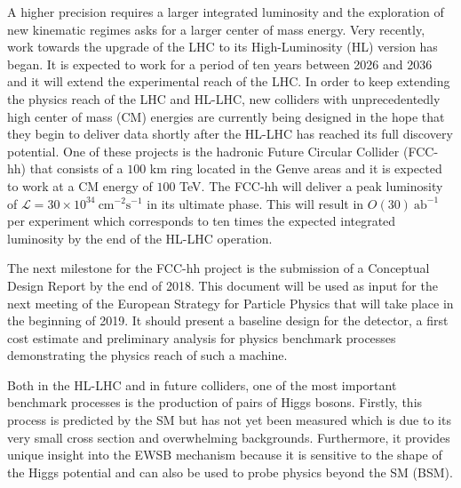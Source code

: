 A higher precision requires a larger integrated luminosity and the exploration of new kinematic regimes asks for a larger center of mass energy. Very recently, work towards the upgrade of the LHC to its High-Luminosity (HL) version has began. It is expected to work for a period of ten years between 2026 and 2036 and it will extend the experimental reach of the LHC. In order to keep extending the physics reach of the LHC and HL-LHC, new colliders with unprecedentedly high center of mass (CM) energies are currently being designed in the hope that they begin to deliver data shortly after the HL-LHC has reached its full discovery potential. One of these projects is the hadronic Future Circular Collider (FCC-hh) that consists of a $100$ km ring located in the Genve areas and it is expected to work at a CM energy of $100$ TeV. The FCC-hh will deliver a peak luminosity of $\mathcal{L}=30\times 10^{34}~\text{cm}^{-2}\text{s}^{-1}$ in its ultimate phase. This will result in $O(30)~\text{ab}^{-1}$ per experiment which corresponds to ten times the expected integrated luminosity by the end of the HL-LHC operation. 

The next milestone for the FCC-hh project is the submission of a Conceptual Design Report by the end of 2018. This document will be used as input for the next meeting of the European Strategy for Particle Physics that will take place in the beginning of 2019. It should present a baseline design for the detector, a first cost estimate and preliminary analysis for physics benchmark processes demonstrating the physics reach of such a machine.

Both in the HL-LHC and in future colliders, one of the most important benchmark processes is the production of pairs of Higgs bosons. Firstly, this process is predicted by the SM but has not yet been measured which is due to its very small cross section and overwhelming backgrounds. Furthermore, it provides unique insight into the EWSB mechanism because it is sensitive to the shape of the Higgs potential and can also be used to probe physics beyond the SM (BSM).

